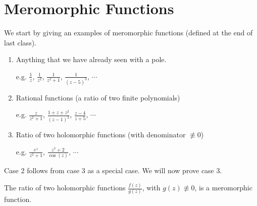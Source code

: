 \setcounter{section}{0}
\setcounter{theorem}{0}




\section{Meromorphic Functions}

We start by giving an examples of meromorphic functions (defined at the end of last class).

\begin{example}
\hphantom{M} %
\begin{enumerate}
    \item Anything that we have already seen with a pole.
    \begin{center}
        e.g. $\frac{1}{z}$, $\frac{1}{z^2}$, $\frac{1}{z^2+1}$, $\frac{1}{(z-5)^3}$, $\cdots$
    \end{center}
    
    \item Rational functions (a ratio of two finite polynomials)
    \begin{center}
        e.g. $\frac{z}{z^2+1}$, $\frac{1+z+z^2}{(z-1)^2}$, $\frac{z-4}{z+5}$, $\cdots$
    \end{center}
    
    \item Ratio of two holomorphic functions (with denominator $\not\equiv 0$)
    \begin{center}
        e.g. $\frac{e^z}{z^2+1}$, $\frac{z^5+2}{\cos(z)}$, $\cdots$
    \end{center}
\end{enumerate}

\end{example}

\begin{note}
Case 2 follows from case 3 as a special case. We will now prove case 3.
\end{note}

\begin{proposition}
The ratio of two holomorphic functions $\frac{f(z)}{g(z)}$, with $g(z) \not\equiv 0$, is a meromorphic function.
\end{proposition}

